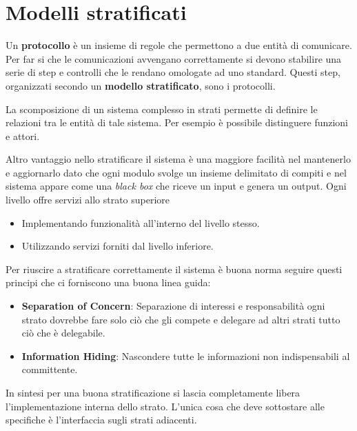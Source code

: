 \section{Modelli stratificati}
Un \textbf{protocollo} è un insieme di regole che permettono a due entità di comunicare. Per far 
si che le comunicazioni avvengano correttamente si devono stabilire una serie di step e controlli 
che le rendano omologate ad uno standard. Questi step, organizzati secondo un
\textbf{modello stratificato}, sono i protocolli.

La scomposizione di un sistema complesso in strati permette di definire le relazioni tra le entità
di tale sistema. Per esempio è possibile distinguere funzioni e attori.

Altro vantaggio nello stratificare il sistema è una maggiore facilità nel mantenerlo e aggiornarlo
dato che ogni modulo svolge un insieme delimitato di compiti e nel sistema appare come una 
\emph{black box} che riceve un input e genera un output. Ogni livello offre servizi allo strato
superiore
\begin{itemize}
	\item Implementando funzionalità all'interno del livello stesso.
	\item Utilizzando servizi forniti dal livello inferiore.
\end{itemize}
Per riuscire a stratificare correttamente il sistema è buona norma seguire questi principi che 
ci forniscono una buona linea guida:
\begin{itemize}
	\item \textbf{Separation of Concern}: Separazione di interessi e responsabilità ogni strato
		dovrebbe fare solo ciò che gli compete e delegare ad altri strati tutto ciò che è
		delegabile.
	\item \textbf{Information Hiding}: Nascondere tutte le informazioni non indispensabili al 
		committente.
\end{itemize}
In sintesi per una buona stratificazione si lascia completamente libera l'implementazione interna
dello strato. L'unica cosa che deve sottostare alle specifiche è l'interfaccia sugli strati
adiacenti.

